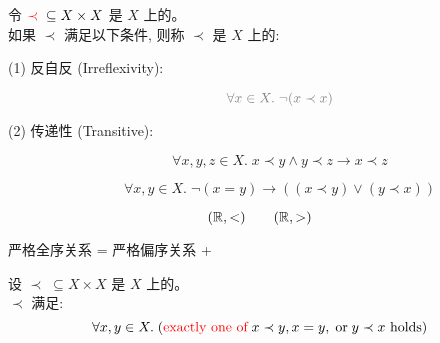 \begin{frame}{}
  \begin{definition}
    令 $\textcolor{red}{\prec} \;\subseteq X \times X$ 是 $X$ 上的。\\[3pt]
    如果 $\prec$ 满足以下条件, 则称 $\prec$ 是 $X$ 上的: \\[6pt]
    \begin{description}
      \item[(1) 反自反 (Irreflexivity):]
        \[
          \gray{\forall x \in X.\; \lnot (x \prec x)}
        \]
      \item[(2) 传递性 (Transitive):]
        \[
          \forall x, y, z \in X.\; x \prec y \land y \prec z \to x \prec z
        \]
      \item[]
        \[
          \forall x, y \in X.\; \lnot (x = y) \to ((x \prec y) \lor (y \prec x))
        \]
    \end{description}
  \end{definition}

  \vspace{-0.20cm}
  \[
    (\mathbb{R}, <) \qquad (\mathbb{R}, >)
  \]
  \pause
  \vspace{-0.50cm}
  \begin{center}
    严格全序关系 = 严格偏序关系 + 
  \end{center}
\end{frame}

%

\begin{frame}{}
  \begin{theorem}
    设 $\prec\; \subseteq X \times X$ 是 $X$ 上的。\\[5pt]
    $\prec$ 满足:
    \[
      \forall x, y \in X.\;
        (\text{\textcolor{red}{exactly one of}}\; x \prec y, x = y, \;\text{or}\; y \prec x \text{ holds})
    \]
  \end{theorem}
\end{frame}
